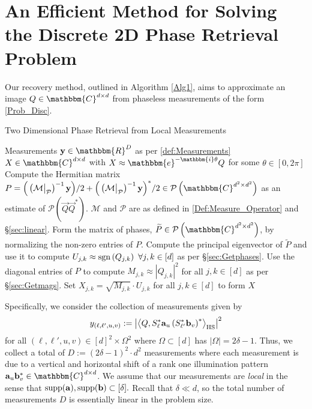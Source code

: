 \documentclass[]{spie}  %
\def \vec{\overrightarrow}
\def \a {\mathbf a}
\def \b {\mathbf b}
\def \x {\mathbf x}
\def \y {\mathbf y}
\def \C {\mathbbm{C}}
\def \HS {\rm HS}
\def \sgn {{\rm sgn}}
\def \supp {{\rm supp}}
\begin{document}
\section{An Efficient Method for Solving the Discrete 2D Phase Retrieval Problem}
\label{sec:TheMethod}
Our recovery method, outlined in Algorithm \ref{Alg1}, aims to approximate an image $Q\in \C^{d\times d}$ from phaseless measurements of the form \eqref{Prob_Disc}.    
%
%
\begin{algorithm}[htbp]
\renewcommand{\algorithmicrequire}{\textbf{Input:}}
\renewcommand{\algorithmicensure}{\textbf{Output:}}
\caption{Two Dimensional Phase Retrieval from Local Measurements}
\label{Alg1}
\begin{algorithmic}[1]
    \REQUIRE Measurements $\y\in \mathbbm{R}^D$ as per \eqref{def:Measurements}
    \ENSURE $X \in \mathbbm{C}^{d \times d}$ with $X \approx \mathbbm{e}^{-\mathbbm{i} \theta} Q$ for some $\theta \in [0, 2 \pi]$ 
    \STATE Compute the Hermitian matrix $P = \Big( \left(\mathcal{M} \big|_{\mathcal{P}}\right)^{-1} {\bf y}\Big)/2 + \Big( \left(\mathcal{M} \big|_{\mathcal{P}}\right)^{-1} {\bf y}\Big)^*/2  \in \mathcal{P}\left(\mathbbm{C}^{d^2\times d^2}\right)$ as an estimate of $\mathcal{P} \left( \vec{Q} \vec{Q}^* \right)$.  $\mathcal{M}$ and $\mathcal{P}$ are as defined in \eqref{Def:Measure_Operator} and \S\ref{sec:linear}.
    \STATE Form the matrix of phases, $\widetilde{P} \in \mathcal{P}\left(\mathbbm{C}^{d^2\times d^2}\right)$, by normalizing the non-zero entries of $P$.
    \STATE Compute the principal eigenvector of $\widetilde{P}$ and use it to compute $U_{j,k} \approx \sgn\left( Q_{j,k}\right) ~\forall j,k \in [d]$ as per \S\ref{sec:Getphases}.
    \STATE Use the diagonal entries of $P$ to compute $M_{j,k} \approx \left| Q_{j,k} \right|^2$ for all $j,k \in [d]$ as per \S\ref{sec:Getmags}.
    \STATE Set $X_{j,k} = \sqrt{M_{j,k}} \cdot U_{j,k}$ for all $j,k \in [d]$ to form $X$
    \end{algorithmic}
\end{algorithm}
%
%
%
Specifically, we consider the collection of measurements given by 
\begin{equation}
y_{(\ell,\ell',u,v)} := \left| \left\langle Q, S^*_{\ell} \a_u \left(S^*_{\ell'} \b_v \right)^* \right\rangle_{\HS} \right|^2
\label{def:Measurements}
\end{equation}
for all $(\ell,\ell',u,v) \in [d]^2 \times\Omega^2$ where $\Omega \subset [d]$ has $|\Omega| = 2\delta-1$.  Thus, we collect a total of $D := (2\delta-1)^2 \cdot d^2 $ measurements where each measurement is due to a vertical and horizontal shift of a rank one illumination pattern $\a_u \b_v^* \in \mathbbm{C}^{d \times d}$.  We assume that our measurements are \emph{local} in the sense that $\supp(\a), \supp(\b) \subset [\delta].$ %
 Recall that $\delta \ll d$, so the total number of measurements $D$ is essentially linear in the problem size.
\end{document}
